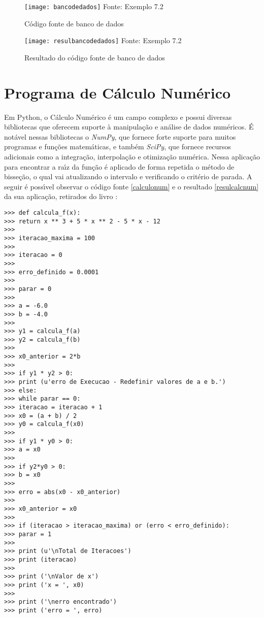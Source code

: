 \begin{figure}[H]
	\begin{center}
		\caption{C\'{o}digo fonte de banco de dados} \label{bancodedados}
		\texttt{[image: bancodedados]} 
		\newline
		Fonte: Exemplo 7.2
	\end{center}
\end{figure}

\begin{figure}[H]
	\begin{center}
		\caption{Resultado do c\'{o}digo fonte de banco de dados} \label{resulbancodedados}
		\texttt{[image: resulbancodedados]} 
		\newline
		Fonte: Exemplo 7.2
	\end{center}
\end{figure}

\section{Programa de C\'{a}lculo Num\'{e}rico}

Em Python, o C\'{a}lculo Num\'{e}rico \'{e} um campo complexo e possui diversas bibliotecas que oferecem suporte \`{a} manipula\c{c}\~{a}o e an\'{a}lise de dados num\'{e}ricos. \'{E} not\'{a}vel nessas bibliotecas o \textsl{NumPy}, que fornece forte suporte para muitos programas e fun\c{c}\~{o}es matem\'{a}ticas, e tamb\'{e}m \textsl{SciPy}, que fornece recursos adicionais como a integra\c{c}\~{a}o, interpola\c{c}\~{a}o e otimiza\c{c}\~{a}o num\'{e}rica. Nessa aplica\c{c}\~{a}o para encontrar a ra\'{\i}z da fun\c{c}\~{a}o \'{e} aplicado de forma repetida o m\'{e}todo de bisse\c{c}\~{a}o, o qual vai atualizando o intervalo e verificando o crit\'{e}rio de parada. A seguir \'{e} poss\'{\i}vel observar o c\'{o}digo fonte \ref{calculonum} e o resultado \ref{resulcalcnum} da sua aplica\c{c}\~{a}o, retirados do livro \cite{Marcondes2018}:

\begin{lstlisting}
>>> def calcula_f(x):
>>> return x ** 3 + 5 * x ** 2 - 5 * x - 12
>>> 
>>> iteracao_maxima = 100
>>> 
>>> iteracao = 0
>>> 
>>> erro_definido = 0.0001
>>> 
>>> parar = 0
>>> 
>>> a = -6.0  
>>> b = -4.0  
>>> 
>>> y1 = calcula_f(a)  
>>> y2 = calcula_f(b) 
>>> 
>>> x0_anterior = 2*b
>>> 
>>> if y1 * y2 > 0:
>>> print (u'erro de Execucao - Redefinir valores de a e b.')
>>> else:
>>> while parar == 0:
>>> iteracao = iteracao + 1  
>>> x0 = (a + b) / 2  
>>> y0 = calcula_f(x0)  
>>> 
>>> if y1 * y0 > 0:
>>> a = x0  
>>> 
>>> if y2*y0 > 0:
>>> b = x0  
>>> 
>>> erro = abs(x0 - x0_anterior)
>>> 
>>> x0_anterior = x0  
>>> 
>>> if (iteracao > iteracao_maxima) or (erro < erro_definido):
>>> parar = 1
>>> 
>>> print (u'\nTotal de Iteracoes')
>>> print (iteracao)
>>> 
>>> print ('\nValor de x')
>>> print ('x = ', x0)
>>> 
>>> print ('\nerro encontrado')
>>> print ('erro = ', erro)
\end{lstlisting}

